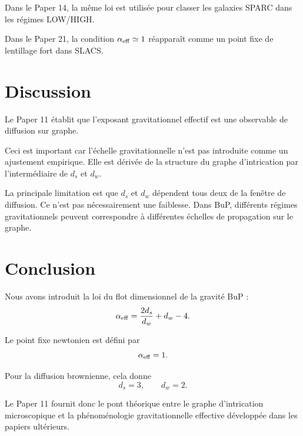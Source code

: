 \documentclass[11pt,a4paper]{article}
\begin{document}
Dans le Paper 14, la même loi est utilisée pour classer les galaxies SPARC dans les régimes LOW/HIGH.

Dans le Paper 21, la condition \(\alpha_{\rm eff} \simeq 1\) réapparaît comme un point fixe de lentillage fort dans SLACS.

\section{Discussion}

Le Paper 11 établit que l'exposant gravitationnel effectif est une observable de diffusion sur graphe.

Ceci est important car l'échelle gravitationnelle n'est pas introduite comme un ajustement empirique. Elle est dérivée de la structure du graphe d'intrication par l'intermédiaire de \(d_s\) et \(d_w\).

La principale limitation est que \(d_s\) et \(d_w\) dépendent tous deux de la fenêtre de diffusion. Ce n'est pas nécessairement une faiblesse. Dans BuP, différents régimes gravitationnels peuvent correspondre à différentes échelles de propagation sur le graphe.

\section{Conclusion}

Nous avons introduit la loi du flot dimensionnel de la gravité BuP :
\[
\alpha_{\rm eff} = \frac{2d_s}{d_w} + d_w - 4.
\]

Le point fixe newtonien est défini par
\[
\alpha_{\rm eff} = 1.
\]

Pour la diffusion brownienne, cela donne
\[
d_s = 3, \qquad d_w = 2.
\]

Le Paper 11 fournit donc le pont théorique entre le graphe d'intrication microscopique et la phénoménologie gravitationnelle effective développée dans les papiers ultérieurs.



\end{document}
